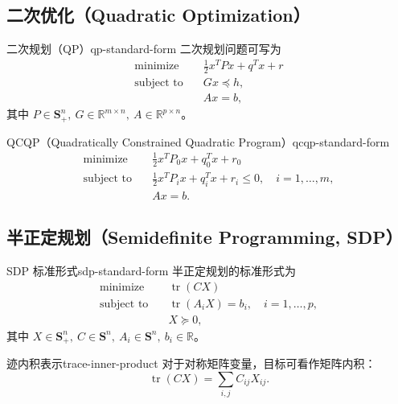 \documentclass[11pt,a4paper]{article}
\begin{document}
\subsection{二次优化（Quadratic Optimization）}
\begin{definition}{二次规划（QP）}{qp-standard-form}
二次规划问题可写为
\[
\begin{aligned}
\text{minimize}\quad & \frac12x^TPx+q^Tx+r\\
\text{subject to}\quad & Gx\preceq h,\\
& Ax=b,
\end{aligned}
\]
其中 $P\in\mathbf S_+^n,\ G\in\mathbb R^{m\times n},\ A\in\mathbb R^{p\times n}$。
\end{definition}

\begin{definition}{QCQP（Quadratically Constrained Quadratic Program）}{qcqp-standard-form}
\[
\begin{aligned}
\text{minimize}\quad & \frac12x^TP_0x+q_0^Tx+r_0\\
\text{subject to}\quad & \frac12x^TP_ix+q_i^Tx+r_i\le0,\quad i=1,\dots,m,\\
& Ax=b.
\end{aligned}
\]
\end{definition}

\subsection{半正定规划（Semidefinite Programming, SDP）}
\begin{definition}{SDP 标准形式}{sdp-standard-form}
半正定规划的标准形式为
\[
\begin{aligned}
\text{minimize}\quad & \operatorname{tr}(CX)\\
\text{subject to}\quad & \operatorname{tr}(A_iX)=b_i,\quad i=1,\dots,p,\\
& X\succeq0,
\end{aligned}
\]
其中 $X\in\mathbf S_+^n,\ C\in\mathbf S^n,\ A_i\in\mathbf S^n,\ b_i\in\mathbb R$。
\end{definition}

\begin{remark}{迹内积表示}{trace-inner-product}
对于对称矩阵变量，目标可看作矩阵内积：
\[
\operatorname{tr}(CX)=\sum_{i,j}C_{ij}X_{ij}.
\]
\end{remark}
\end{document}

